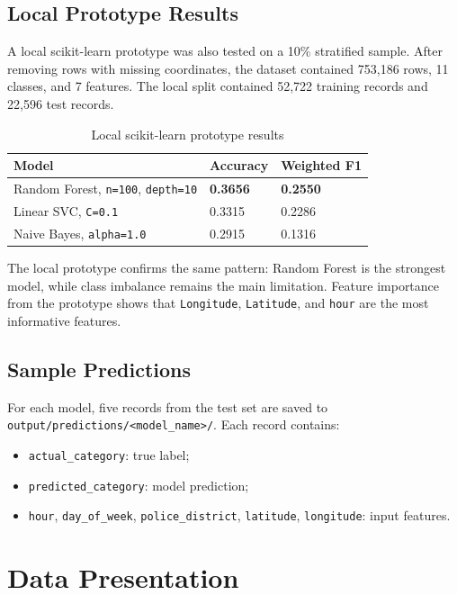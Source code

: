 \documentclass[12pt,a4paper]{article}
\begin{document}
\subsection{Local Prototype Results}

A local scikit-learn prototype was also tested on a 10\% stratified sample. After removing rows with missing coordinates, the dataset contained 753,186 rows, 11 classes, and 7 features. The local split contained 52,722 training records and 22,596 test records.

\begin{table}[H]
\centering
\caption{Local scikit-learn prototype results}
\begin{tabular}{L{7cm} L{3cm} L{3cm}}
\toprule
\textbf{Model} & \textbf{Accuracy} & \textbf{Weighted F1} \\
\midrule
Random Forest, \texttt{n=100}, \texttt{depth=10} & \textbf{0.3656} & \textbf{0.2550} \\
Linear SVC, \texttt{C=0.1} & 0.3315 & 0.2286 \\
Naive Bayes, \texttt{alpha=1.0} & 0.2915 & 0.1316 \\
\bottomrule
\end{tabular}
\end{table}

The local prototype confirms the same pattern: Random Forest is the strongest model, while class imbalance remains the main limitation. Feature importance from the prototype shows that \texttt{Longitude}, \texttt{Latitude}, and \texttt{hour} are the most informative features.

\subsection{Sample Predictions}

For each model, five records from the test set are saved to \texttt{output/predictions/<model\_name>/}. Each record contains:
\begin{itemize}
    \item \texttt{actual\_category}: true label;
    \item \texttt{predicted\_category}: model prediction;
    \item \texttt{hour}, \texttt{day\_of\_week}, \texttt{police\_district}, \texttt{latitude}, \texttt{longitude}: input features.
\end{itemize}

\section{Data Presentation}
\end{document}

